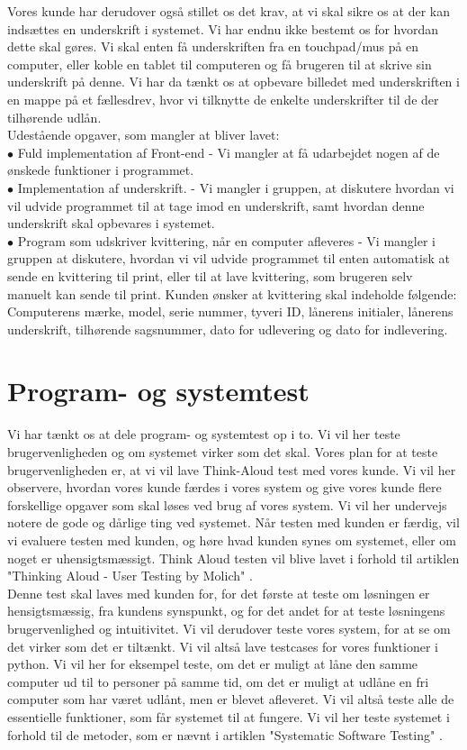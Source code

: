 \documentclass[a4paper]{article}
\begin{document}
Vores kunde har derudover også stillet os det krav, at vi skal sikre os at der kan indsættes en underskrift i systemet. Vi har endnu ikke bestemt os for hvordan dette skal gøres. Vi skal enten få underskriften fra en touchpad/mus på en computer, eller koble en tablet til computeren og få brugeren til at skrive sin underskrift på denne. Vi har da tænkt os at opbevare billedet med underskriften i en mappe på et fællesdrev, hvor vi tilknytte de enkelte underskrifter til de der tilhørende udlån. \\[0.1in]
Udestående opgaver, som mangler at bliver lavet: \\
$\bullet$ Fuld implementation af Front-end - Vi mangler at få udarbejdet nogen af de ønskede funktioner i programmet. \\
$\bullet$ Implementation af underskrift. - Vi mangler i gruppen, at diskutere hvordan vi vil udvide programmet til at tage imod en underskrift, samt hvordan denne underskrift skal opbevares i systemet.\\
$\bullet$ Program som udskriver kvittering, når en computer afleveres - Vi mangler i gruppen at diskutere, hvordan vi vil udvide programmet til enten automatisk at sende en kvittering til print, eller til at lave kvittering, som brugeren selv manuelt kan sende til print. Kunden ønsker at kvittering skal indeholde følgende: Computerens mærke, model, serie nummer, tyveri ID, lånerens initialer, lånerens underskrift, tilhørende sagsnummer, dato for udlevering og dato for indlevering.
\section{Program- og systemtest}
Vi har tænkt os at dele program- og systemtest op i to. Vi vil her teste brugervenligheden og om systemet virker som det skal. Vores plan for at teste brugervenligheden er, at vi vil lave Think-Aloud test med vores kunde. Vi vil her observere, hvordan vores kunde færdes i vores system og give vores kunde flere forskellige opgaver som skal løses ved brug af vores system. Vi vil her undervejs notere de gode og dårlige ting ved systemet. Når testen med kunden er færdig, vil vi evaluere testen med kunden, og høre hvad kunden synes om systemet, eller om noget er uhensigtsmæssigt. Think Aloud testen vil blive lavet i forhold til artiklen "Thinking Aloud - User Testing by Molich" \cite{ThinkAloud}. \\[0.1in]
Denne test skal laves med kunden for, for det første at teste om løsningen er hensigtsmæssig, fra kundens synspunkt, og for det andet for at teste løsningens brugervenlighed og intuitivitet. 
Vi vil derudover teste vores system, for at se om det virker som det er tiltænkt. Vi vil altså lave testcases for vores funktioner i python. Vi vil her for eksempel teste, om det er muligt at låne den samme computer ud til to personer på samme tid, om det er muligt at udlåne en fri computer som har været udlånt, men er blevet afleveret. Vi vil altså teste alle de essentielle funktioner, som får systemet til at fungere. Vi vil her teste systemet i forhold til de metoder, som er nævnt i artiklen "Systematic Software Testing" \cite{SoftwareTest}.
\end{document}

